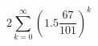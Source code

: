 \documentclass[letterpaper,12pt]{article}
\begin{document}
\[
2 \sum_{k=0}^{\infty} (1.5\frac{67}{101})^k
\]
\end{document}
